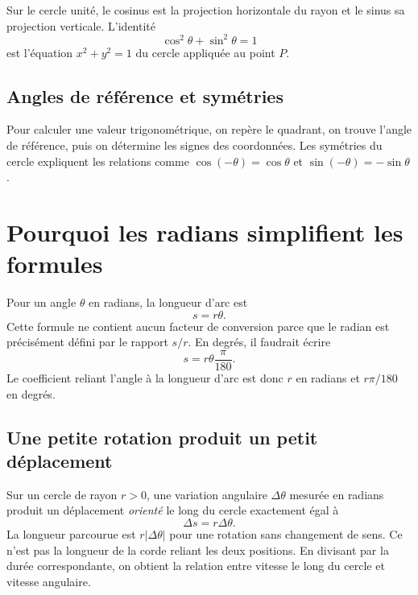 \begin{connectionbox}
Sur le cercle unité, le cosinus est la projection horizontale du rayon et le sinus sa projection verticale. L'identité
\[
\cos^2\theta+\sin^2\theta=1
\]
est l'équation $x^2+y^2=1$ du cercle appliquée au point $P$.
\end{connectionbox}

\subsection{Angles de référence et symétries}
Pour calculer une valeur trigonométrique, on repère le quadrant, on trouve l'angle de référence, puis on détermine les signes des coordonnées. Les symétries du cercle expliquent les relations comme $\cos(-\theta)=\cos\theta$ et $\sin(-\theta)=-\sin\theta$.


\section{Pourquoi les radians simplifient les formules}
\label{manual:section:14.06}

Pour un angle $\theta$ en radians, la longueur d'arc est
\[
s=r\theta.
\]
Cette formule ne contient aucun facteur de conversion parce que le radian est précisément défini par le rapport $s/r$. En degrés, il faudrait écrire
\[
s=r\theta\frac{\pi}{180}.
\]
Le coefficient reliant l'angle à la longueur d'arc est donc $r$ en radians et $r\pi/180$ en degrés.

\subsection{Une petite rotation produit un petit déplacement}
Sur un cercle de rayon \(r>0\), une variation angulaire \(\Delta\theta\) mesurée en radians produit un déplacement \emph{orienté} le long du cercle exactement égal à
\[
\Delta s=r\Delta\theta.
\]
La longueur parcourue est \(r|\Delta\theta|\) pour une rotation sans changement de sens. Ce n'est pas la longueur de la corde reliant les deux positions.
En divisant par la durée correspondante, on obtient la relation entre vitesse le long du cercle et vitesse angulaire.

\begin{center}
\end{center}

